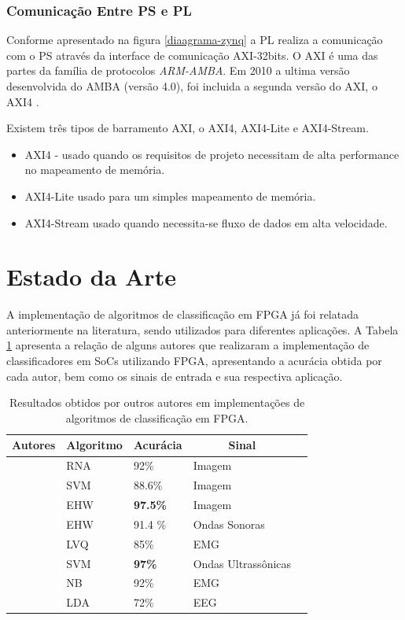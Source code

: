 \subsubsection{Comunicação Entre PS e PL}
Conforme apresentado na figura \ref{diaagrama-zynq} a PL realiza a comunicação com 
o PS através da interface de comunicação AXI-32bits. O AXI é uma das partes da família de protocolos \textit{ARM-AMBA}. Em 2010 a ultima versão desenvolvida do AMBA (versão 4.0), foi incluida a segunda versão do AXI, o AXI4 \cite{user-guide-axi}.

Existem três tipos de barramento AXI, o AXI4, AXI4-Lite e AXI4-Stream.

\begin{itemize}
	\item AXI4 - usado quando os requisitos de projeto necessitam de alta performance no mapeamento de memória.
	\item AXI4-Lite usado para um simples mapeamento de memória.
	\item AXI4-Stream usado quando necessita-se fluxo de dados em alta velocidade.
\end{itemize}


\section{Estado da Arte}
A implementação de algoritmos de classificação em FPGA já foi relatada anteriormente na literatura, sendo utilizados para diferentes aplicações. A Tabela \ref{estado_da_arte} apresenta a relação de alguns autores que realizaram a implementação de classificadores em SoCs utilizando FPGA, apresentando a acurácia obtida por cada autor, bem como os sinais de entrada e sua respectiva aplicação.

\begin{table}[h!]
	\centering
	\caption{Resultados obtidos por outros autores em implementações de algoritmos de classificação em FPGA.}
	\label{estado_da_arte}
	\begin{tabular}{|l|l|l|l|l|}
		\hline
		\multicolumn{1}{|c|}{\textbf{Autores}} & \multicolumn{1}{c|}{\textbf{Algoritmo}} &  \multicolumn{1}{c|}{\textbf{Acurácia}} & \multicolumn{1}{c|}{\textbf{Sinal}} \\ \hline
		\textit{\cite{RNAFPGA}} & RNA & 92\% & Imagem \\ \hline
		\textit{\cite{Irick}} & SVM  & 88.6\% & Imagem \\ \hline
		\textit{\cite{Glette2009}} & EHW  & \textbf{97.5\%} & Imagem \\ \hline
		\textit{\cite{Glette2007}} & EHW & 91.4 \% & Ondas Sonoras \\ \hline
		\textit{\cite{Alkim}} & LVQ & 85\% & EMG \\ \hline
		\textit{\cite{Yuan}} & SVM & \textbf{97\%} & Ondas Ultrassônicas \\ \hline
		\textit{\cite{Chen}} & NB & 92\% & EMG \\ \hline
		\textit{\cite{Kais}} & LDA & 72\% & EEG \\ \hline
	\end{tabular}
\end{table}

